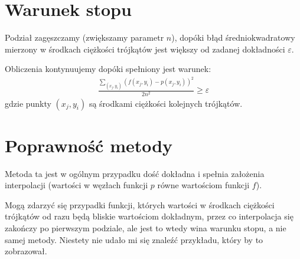 \documentclass[12pt]{article}
\begin{document}
	\section{Warunek stopu}
	Podział zagęszczamy (zwiększamy parametr $n$), dopóki błąd średniokwadratowy mierzony w środkach ciężkości trójkątów jest większy od zadanej dokładności $\varepsilon$.
	
	Obliczenia kontynuujemy dopóki spełniony jest warunek:
	\begin{align*}
		\frac{\sum_{(x_j, y_i)} (f(x_j, y_i) - p(x_j, y_i))^2}{2n^2} \geq \varepsilon
	\end{align*}
	gdzie punkty $(x_j, y_i)$ są środkami ciężkości kolejnych trójkątów.
	
	\section{Poprawność metody}
	Metoda ta jest w ogólnym przypadku dość dokładna i spełnia założenia interpolacji (wartości w węzłach funkcji $p$ równe wartościom funkcji $f$).
	
	Mogą zdarzyć się przypadki funkcji, których wartości w środkach ciężkości trójkątów od razu będą bliskie wartościom dokładnym, przez co interpolacja się zakończy po pierwszym podziale, ale jest to wtedy wina warunku stopu, a nie samej metody. Niestety nie udało mi się znaleźć przykładu, który by to zobrazował.
	
\end{document}

